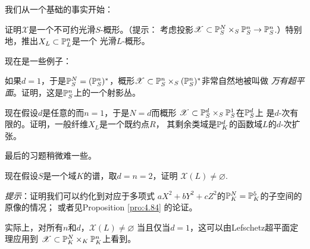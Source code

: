我们从一个基础的事实开始：

\begin{exe}\label{exe:3.51}
证明$\mathscr X$是一个不可约光滑$S$-概形。（提示：
考虑投影$\mathscr X\subset \P_S^N\times_S \P_S^n
\to \P_S^n$.）特别地，推出$X_L\subset \P^n_L$是一个
光滑$L$-概形。
\end{exe}

现在是一些例子：

\begin{exe}\label{exe:3.52}
如果$d=1$，于是$\P_S^N=(\P^n_S)^*$，概形$\mathscr X
\subset \P_S^n\times_S (\P^n_S)^*$非常自然地被叫做
\textit{万有超平面}。证明，这是$\P_S^n$上的一个射影丛。
\end{exe}

\begin{exe}\label{exe:3.53}
现在假设$d$是任意的而$n=1$，于是$N=d$而概形
$\mathscr X\subset \P_S^d\times_S \P^1_S$在$\P_S^d$上
是$d$-次有限的。证明，一般纤维$X_L$是一个既约点$R$，
其剩余类域是$\P_K^d$的函数域$L$的$d$-次扩张。
\end{exe}

最后的习题稍微难一些。

\begin{exe}\label{exe:3.54}
现在假设$S$是一个域$K$的谱，取$d=n=2$，证明
$\mathscr X(L)\neq \varnothing$.

\textit{提示}：证明我们可以约化到对应于多项式
$aX^2+bY^2+cZ^2$的$\P^N_K=\P^5_K$的子空间的原像的情况；
或者见Proposition \ref{pro:4.84} 的论证。
\end{exe}

实际上，对所有$n$和$d$，$\mathscr X(L)\neq \varnothing$
当且仅当$d=1$，这可以由Lefschetz超平面定理应用到
$\mathscr X\subset \P_K^N\times_K \P_K^n$上看到。